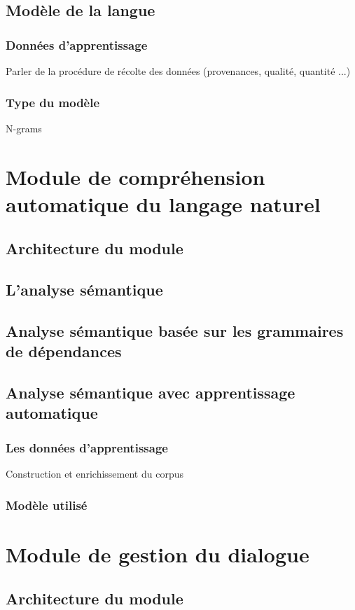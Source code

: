 	\subsection{Modèle de la langue}
		\subsubsection*{Données d'apprentissage}
		Parler de la procédure de récolte des données (provenances, qualité, quantité ...)
		\subsubsection*{Type du modèle}
		N-grams

\section{Module de compréhension automatique du langage naturel }
	\subsection{Architecture du module}
	\subsection{L'analyse sémantique}
	\subsection{Analyse sémantique basée sur les grammaires de dépendances}
	\subsection{Analyse sémantique avec apprentissage automatique}
		\subsubsection{Les données d'apprentissage}
		Construction et enrichissement du corpus 
		\subsubsection{Modèle utilisé}
	
	
\section{Module de gestion du dialogue}
	\subsection{Architecture du module}

